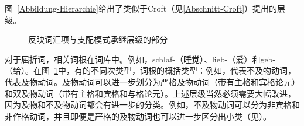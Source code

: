 图~\vref{Abbildung-Hierarchie}给出了类似于Croft（见\ref{Abschnitt-Croft}）提出的层级。
\begin{figure}
\caption{\label{Abbildung-Hierarchie}反映词汇项与支配模式承继层级的部分}
\end{figure}%
对于屈折词，相关词根在词库中。例如，schlaf-（睡觉）、lieb-（爱）和geb-（给）。在图~\ref{Abbildung-Hierarchie}中，有的不同次类型，词根的概括类型：例如，代表不及物动词， 代表及物动词。及物动词可以进一步划分为严格及物动词（带有主格和宾格论元）和双及物动词（带有主格和宾格和与格论元）。上述层级当然必须需要大幅改进，因为及物和不及物动词都会有进一步的分类。例如，不及物动词可以分为非宾格和非作格动词，并且即便是严格的及物动词也可以进一步区分出小类（见\citet[\S~2]{Welke2009a}）。

